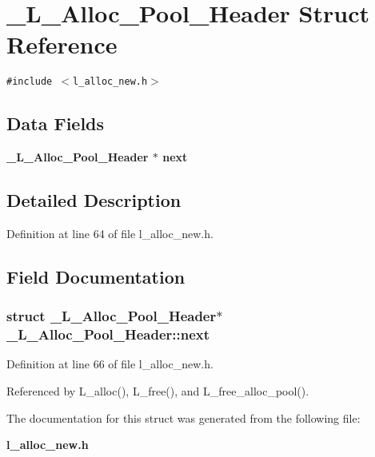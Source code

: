 \section{\_\-L\_\-Alloc\_\-Pool\_\-Header Struct Reference}
\label{struct__L__Alloc__Pool__Header}
{\tt \#include $<$l\_\-alloc\_\-new.h$>$}

\subsection*{Data Fields}
\begin{CompactItemize}
\item 
\bf{\_\-L\_\-Alloc\_\-Pool\_\-Header} $\ast$ \bf{next}
\end{CompactItemize}


\subsection{Detailed Description}




Definition at line 64 of file l\_\-alloc\_\-new.h.

\subsection{Field Documentation}
\subsubsection{\setlength{\rightskip}{0pt plus 5cm}struct \bf{\_\-L\_\-Alloc\_\-Pool\_\-Header}$\ast$ \bf{\_\-L\_\-Alloc\_\-Pool\_\-Header::next}}\label{struct__L__Alloc__Pool__Header_aac9809d3e1dedecd94170c70f113041}




Definition at line 66 of file l\_\-alloc\_\-new.h.

Referenced by L\_\-alloc(), L\_\-free(), and L\_\-free\_\-alloc\_\-pool().

The documentation for this struct was generated from the following file:\begin{CompactItemize}
\item 
\bf{l\_\-alloc\_\-new.h}\end{CompactItemize}
